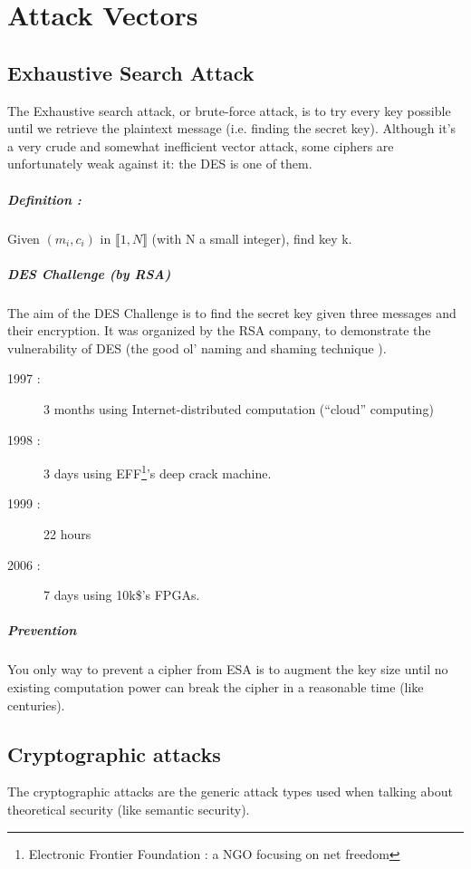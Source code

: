 \chapter{Attack Vectors}


\section{Exhaustive Search Attack}
    The Exhaustive search attack, or brute-force attack, is to try every key possible until we retrieve the plaintext message (i.e. finding the secret key). Although it's a very crude and somewhat inefficient vector attack, some ciphers are unfortunately weak against it: the DES is one of them.
    
\paragraph{Definition :}
Given $(m_i,c_i)$ in $\llbracket 1,N \rrbracket$ (with N a small integer), find key k.

\paragraph{DES Challenge (by RSA)\\}
The aim of the DES Challenge is to find the secret key given three messages and their encryption. It was organized by the RSA company, to demonstrate the vulnerability of DES (the good ol' naming and shaming technique ).

\begin{description}
\item[1997 : ] 3 months using Internet-distributed computation (``cloud'' computing)
\item[1998 : ] 3 days using EFF\footnote{Electronic Frontier Foundation : a NGO focusing on net freedom}'s deep crack machine.
\item[1999 : ] 22 hours
\item[2006 : ] 7 days using 10k\$'s FPGAs.
\end{description}

\paragraph{Prevention}
You only way to prevent a cipher from ESA is to augment the key size until no existing computation power can break the cipher in a reasonable time (like centuries).

\section{Cryptographic attacks}
The cryptographic attacks are the generic attack types used when talking about theoretical security (like semantic security).

